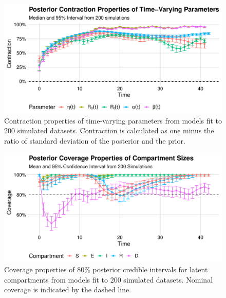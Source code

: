 \begin{figure}[htbp]
    \centering
    \includegraphics[width=1.0\columnwidth]{generated_quantities_simulation_time_varying_shrinkage_plot}
    \caption{Contraction properties of time-varying parameters from models fit to 200 simulated datasets.
    Contraction is calculated as one minus the ratio of standard deviation of the posterior and the prior.}
    \label{ch_4:fig:generated_quantities_simulation_time_varying_shrinkage_plot}
\end{figure}

\begin{figure}[htbp]
    \centering
    \includegraphics[width=1.0\columnwidth]{generated_quantities_simulation_compartment_coverage_plot}
    \caption{Coverage properties of 80\% posterior credible intervals for latent compartments from models fit to 200 simulated datasets.
    Nominal coverage is indicated by the dashed line.}
    \label{ch_4:fig:generated_quantities_simulation_compartment_coverage_plot}
\end{figure}

